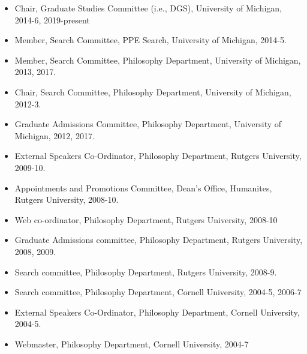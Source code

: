 \documentclass[
  10pt,
  letterpaper,
  DIV=11,
  numbers=noendperiod,
  twoside]{scrartcl}
\providecommand{\tightlist}{%
  \setlength{\itemsep}{0pt}\setlength{\parskip}{0pt}}\usepackage{longtable,booktabs,array}
\begin{document}
\begin{itemize}
\tightlist
\item
  Chair, Graduate Studies Committee (i.e., DGS), University of Michigan,
  2014-6, 2019-present
\item
  Member, Search Committee, PPE Search, University of Michigan, 2014-5.
\item
  Member, Search Committee, Philosophy Department, University of
  Michigan, 2013, 2017.
\item
  Chair, Search Committee, Philosophy Department, University of
  Michigan, 2012-3.
\item
  Graduate Admissions Committee, Philosophy Department, University of
  Michigan, 2012, 2017.
\item
  External Speakers Co-Ordinator, Philosophy Department, Rutgers
  University, 2009-10.
\item
  Appointments and Promotions Committee, Dean's Office, Humanites,
  Rutgers University, 2008-10.
\item
  Web co-ordinator, Philosophy Department, Rutgers University, 2008-10
\item
  Graduate Admissions committee, Philosophy Department, Rutgers
  University, 2008, 2009.
\item
  Search committee, Philosophy Department, Rutgers University, 2008-9.
\item
  Search committee, Philosophy Department, Cornell University, 2004-5,
  2006-7
\item
  External Speakers Co-Ordinator, Philosophy Department, Cornell
  University, 2004-5.
\item
  Webmaster, Philosophy Department, Cornell University, 2004-7
\end{itemize}
\end{document}
